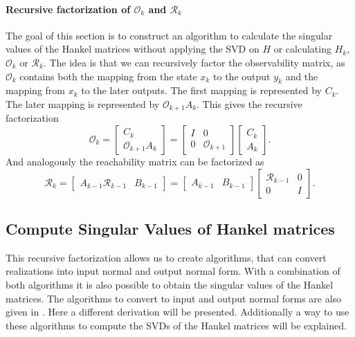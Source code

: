\documentclass[numbers=noenddot,doctype=mastersthesis,BCOR=15mm,biblatex]{ldvbook}%
\newcommand{\R}{\mathcal{R}} %
\newcommand{\Ob}{\mathcal{O}} %
\newcommand{\eye}{I} %
\begin{document}
\paragraph{Recursive factorization of $\Ob_k$ and  $\R_k$}
The goal of this section is to construct an algorithm to calculate the singular values of the Hankel matrices without applying the SVD on $H$ or calculating $H_k$, $\Ob_k$ or $\R_k$.
The idea is that we can recursively factor the observability matrix, as $\Ob_k$ contains both the mapping from the state $x_k$ to the output $y_k$ and the mapping from $x_k$ to the later outputs.
The first mapping is represented by $C_k$.
The later mapping is represented by $\Ob_{k+1}A_k$.
This gives the recursive factorization
\begin{equation}\label{eq:decomp_O}
	\Ob_k = 
	\begin{bmatrix}
	C_k\\
	\Ob_{k+1}A_k
	\end{bmatrix}
	=
	\begin{bmatrix}
	\eye& 0 \\
	0& \Ob_{k+1}
	\end{bmatrix}
	\begin{bmatrix}
	C_k\\
	A_k
	\end{bmatrix}
	.
\end{equation}
And analogously the reachability matrix can be factorized as
\begin{equation}\label{eq:decomp_R}
	\R_k = 
	\begin{bmatrix}
	A_{k-1} \R_{k-1} & B_{k-1}
	\end{bmatrix}
	=
	\begin{bmatrix}
	A_{k-1} & B_{k-1}
	\end{bmatrix}
	\begin{bmatrix}
	\R_{k-1} &0\\
	0& \eye
	\end{bmatrix}
	.
\end{equation}

\subsection{Compute Singular Values of Hankel matrices}
This recursive factorization allows us to create algorithms, that can convert realizations into input normal and output normal form.
With a combination of both algorithms it is also possible to obtain the singular values of the Hankel matrices.
The algorithms to convert to input and output normal forms are also given in \cite{chandrasekaran_fast_2005}.
Here a different derivation will be presented. Additionally a way to use these algorithms to compute the SVDs of the Hankel matrices will be explained. 
\end{document}
